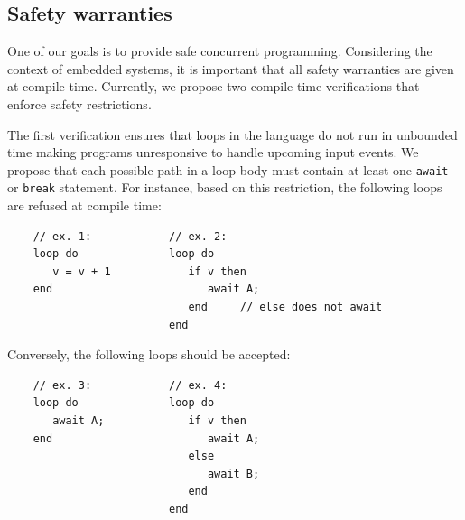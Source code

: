 \documentclass[pdftex,12pt,a4paper]{article}
\newcommand{\code}[1] {{\small{\texttt{#1}}}}
\begin{document}

\subsection{Safety warranties}

One of our goals is to provide safe concurrent programming.
Considering the context of embedded systems, it is important that all safety 
warranties are given at compile time.
Currently, we propose two compile time verifications that enforce safety 
restrictions.

The first verification ensures that loops in the language do not run in 
unbounded time making programs unresponsive to handle upcoming input events.
We propose that each possible path in a loop body must contain at least one 
\code{await} or \code{break} statement.
For instance, based on this restriction, the following loops are refused at 
compile time:

{\small
\begin{verbatim}
    // ex. 1:            // ex. 2:
    loop do              loop do
       v = v + 1            if v then
    end                        await A;
                            end     // else does not await
                         end
\end{verbatim}
}
Conversely, the following loops should be accepted:
{\small
\begin{verbatim}
    // ex. 3:            // ex. 4:
    loop do              loop do
       await A;             if v then
    end                        await A;
                            else
                               await B;
                            end
                         end
\end{verbatim}
}
\end{document}
